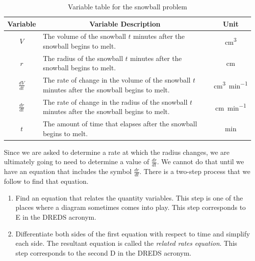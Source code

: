 \documentclass[10pt,oneside,]{book}
\newcommand{\acronym}[1]{#1}
\theoremstyle{plain}
\theoremstyle{definition}
\numberwithin{equation}{section}
\newcommand{\lz}[2]{\frac{d#1}{d#2}}
\begin{document}
\begin{table}
\centering
\caption{Variable table for the snowball problem\label{table-snowball}}
\begin{tabular}{cp{3.5in}c}
\toprule
Variable&\multicolumn{1}{c}{Variable Description}&Unit\\
\midrule
\(V\)&The volume of the snowball \(t\) minutes after the snowball begins to melt.&\si{\centi\meter\tothe{3}}\\
\midrule
\(r\)&The radius of the snowball \(t\) minutes after the snowball begins to melt.&\si{\centi\meter}\\
\midrule
\(\lz{V}{t}\)&The rate of change in the volume of the snowball \(t\) minutes after the snowball begins to melt.&\si{\centi\meter\tothe{3}\per\minute}\\
\midrule
\(\lz{r}{t}\)&The rate of change in the radius of the snowball \(t\) minutes after the snowball begins to melt.&\si{\centi\meter\per\minute}\\
\midrule
\(t\)&The amount of time that elapses after the snowball begins to melt.&\si{\minute}\\
\bottomrule
\end{tabular}
\end{table}
\par
Since we are asked to determine a rate at which the radius changes, we are ultimately going to need to determine a value of \(\lz{r}{t}\). We cannot do that until we have an equation that includes the symbol \(\lz{r}{t}\). There is a two-step process that we follow to find that equation.%
\begin{enumerate}
\item{}Find an equation that relates the quantity variables. This step is one of the places where a diagram sometimes comes into play. This step corresponds to \acronym{E} in the \acronym{DREDS} acronym.\item{}Differentiate both sides of the first equation with respect to time and simplify each side. The resultant equation is called the \emph{related rates equation}. This step corresponds to the second \acronym{D} in the \acronym{DREDS} acronym.\end{enumerate}
\par
\end{document}
